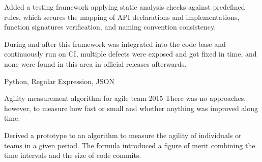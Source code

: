 \begin{cventries}
    {
      \begin{cvitems}
        \item {Added a testing framework applying static analysis checks against predefined rules, which secures the mapping of API declarations and implementations, function signatures verification, and naming convention consistency.}
        \item{During and after this framework was integrated into the code base and continuously run on CI, multiple defects were exposed and got fixed in time, and none were found in this area in official releases afterwards.}
        \item{Python, Regular Expression, JSON}
      \end{cvitems}
    }
  \cventryX
    {Agility measurement algorithm for agile team}
    {2015}
    {There was no approaches, however, to measure how fast or small and whether anything was improved along time.}
    {
      \begin{cvitems}
        \item {Derived a prototype to an algorithm to measure the agility of individuals or teams in a given period. The formula introduced a figure of merit combining the time intervals and the size of code commits.}
      \end{cvitems}
    }
\end{cventries}

